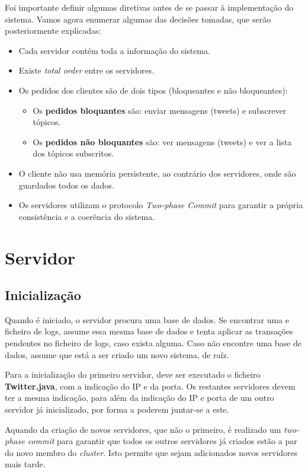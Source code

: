 \documentclass[a4paper]{report}
\begin{document}
	Foi importante definir algumas diretivas antes de se passar à implementação do sistema. Vamos agora enumerar algumas das decisões tomadas, que serão posteriormente explicadas:
	\begin{itemize}
			\item Cada servidor contém toda a informação do sistema.
			\item Existe \textit{total order} entre os servidores.
			\item Os pedidos dos clientes são de dois tipos (bloqueantes e não bloqueantes):
			\begin{itemize}
				\item Os \textbf{pedidos bloquantes} são: enviar mensagens (tweets) e subscrever tópicos. 
				\item Os \textbf{pedidos não bloquantes} são: ver mensagens (tweets) e ver a lista dos tópicos subscritos.
			\end{itemize}
			\item O cliente não usa memória persistente, ao contrário dos servidores, onde são guardados todos os dados.
			\item Os servidores utilizam o protocolo \textit{Two-phase Commit} para garantir a própria consistência e a coerência do sistema.
		\end{itemize}

	\section{Servidor}

		\subsection{Inicialização}
		Quando é iniciado, o servidor procura uma base de dados. Se encontrar uma e ficheiro de logs, assume essa mesma base de dados e tenta aplicar as transações pendentes no ficheiro de logs, caso exista alguma.
		Caso não encontre uma base de dados, assume que está a ser criado um novo sistema, de raíz.

		Para a inicialização do primeiro servidor, deve ser executado o ficheiro \textbf{Twitter.java}, com a indicação do IP e da porta.
		Os restantes servidores devem ter a mesma indicação, para além da indicação do IP e porta de um outro servidor já inicializado, por forma a poderem juntar-se a este.

		Aquando da criação de novos servidores, que não o primeiro, é realizado um \textit{two-phase commit} para garantir que todos os outros servidores já criados estão a par do novo membro do \textit{cluster}.
		Isto permite que sejam adicionados novos servidores mais tarde.
\end{document}
